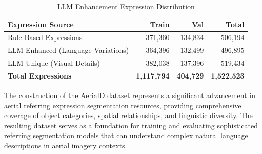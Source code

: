 \begin{table}[H]
\centering
\caption{LLM Enhancement Expression Distribution}
\label{tab:llm_enhancement_stats}
\begin{tabular}{@{}lrrr@{}}
\toprule
\textbf{Expression Source} & \textbf{Train} & \textbf{Val} & \textbf{Total} \\
\midrule
Rule-Based Expressions & 371,360 & 134,834 & 506,194 \\
LLM Enhanced (Language Variations) & 364,396 & 132,499 & 496,895 \\
LLM Unique (Visual Details) & 382,038 & 137,396 & 519,434 \\
\midrule
\textbf{Total Expressions} & \textbf{1,117,794} & \textbf{404,729} & \textbf{1,522,523} \\
\bottomrule
\end{tabular}
\end{table}

The construction of the AerialD dataset represents a significant advancement in aerial referring expression segmentation resources, providing comprehensive coverage of object categories, spatial relationships, and linguistic diversity. The resulting dataset serves as a foundation for training and evaluating sophisticated referring segmentation models that can understand complex natural language descriptions in aerial imagery contexts.



